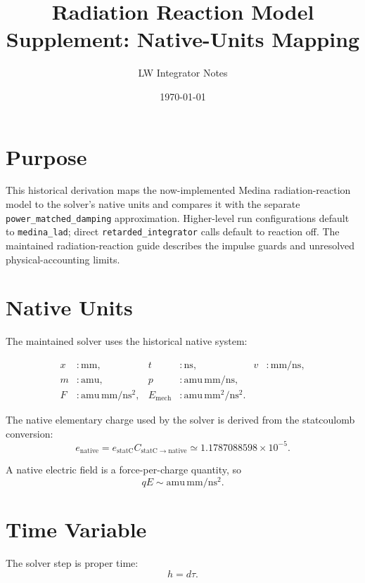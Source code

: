 \documentclass[11pt]{article}
\title{Radiation Reaction Model Supplement: Native-Units Mapping}
\author{LW Integrator Notes}
\date{\today}
\begin{document}
\maketitle

\section{Purpose}

This historical derivation maps the now-implemented Medina radiation-reaction
model to the solver's native units and compares it with the separate
\texttt{power\_matched\_damping} approximation. Higher-level run configurations
default to \texttt{medina\_lad}; direct \texttt{retarded\_integrator} calls
default to reaction off. The maintained radiation-reaction guide describes the
impulse guards and unresolved physical-accounting limits.

\section{Native Units}

The maintained solver uses the historical native system:

\begin{align}
x &: \mathrm{mm}, &
t &: \mathrm{ns}, &
v &: \mathrm{mm/ns},
\\
m &: \mathrm{amu}, &
p &: \mathrm{amu\,mm/ns},
\\
F &: \mathrm{amu\,mm/ns^2}, &
E_{\mathrm{mech}} &: \mathrm{amu\,mm^2/ns^2}.
\end{align}

The native elementary charge used by the solver is derived from the
statcoulomb conversion:
\begin{equation}
e_{\mathrm{native}}
=e_{\mathrm{statC}}C_{\mathrm{statC}\rightarrow\mathrm{native}}
\simeq 1.1787088598 \times 10^{-5}.
\end{equation}

A native electric field is a force-per-charge quantity, so
\begin{equation}
qE \sim \mathrm{amu\,mm/ns^2}.
\end{equation}

\section{Time Variable}

The solver step is proper time:
\begin{equation}
h = d\tau.
\end{equation}
\end{document}
